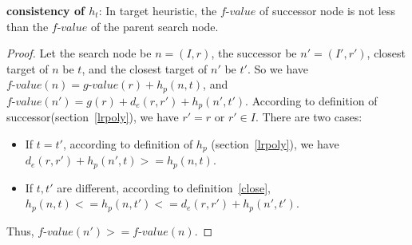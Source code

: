 \begin{theorem}{\textbf{consistency of $h_t$}:}\label{nodesct}
In target heuristic, the $\textit{f-value}$ of successor node is not less than the $\textit{f-value}$ of the parent search node.
\end{theorem}

\begin{proof}
  Let the search node be $n=(I, r)$, the successor be $n'=(I', r')$, closest target of $n$
  be $t$, and the closest target of $n'$ be $t'$. 
  So we have $\textit{f-value}(n) = \textit{g-value}(r) + h_p(n, t)$, and 
  $\textit{f-value}(n') = g(r) + d_e(r, r') + h_p(n', t')$.
  According to definition of successor(section~\ref{lrpoly}), we have $r'=r$ or $r' \in I$.
  There are two cases:
  \begin{itemize}
    \item If $t=t'$, according to definition of $h_p$ (section~\ref{lrpoly}),
      we have $d_e(r, r') + h_p(n', t) >= h_p(n, t)$. 
    \item If $t,t'$ are different, according to definition~\ref{close},
      $h_p(n, t) <= h_p(n, t') <= d_e(r, r') + h_p(n', t')$.
  \end{itemize}
  Thus, $\textit{f-value}(n') >= \textit{f-value}(n)$.
\end{proof}

